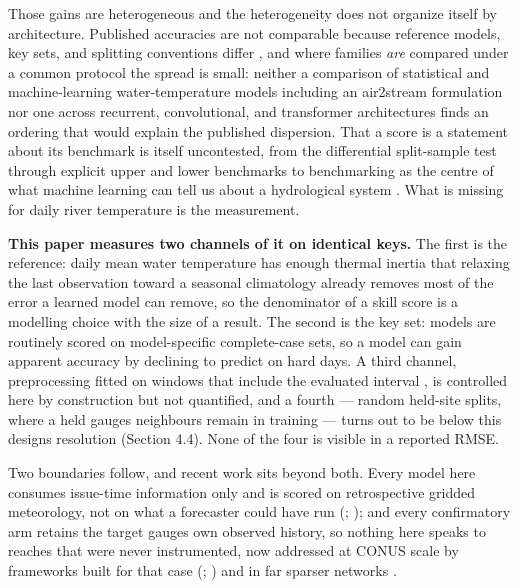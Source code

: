 Those gains are heterogeneous and the heterogeneity does not organize itself by
architecture. Published accuracies are not comparable because reference models,
key sets, and splitting conventions differ
\cite{corona2025ml}, and where
families \emph{are} compared under a common protocol the spread is small: neither a
comparison of statistical and machine-learning water-temperature models
including an air2stream formulation
\cite{feigl2021ml} nor one across
recurrent, convolutional, and transformer architectures
\cite{liu2025rnns} finds an ordering
that would explain the published dispersion. That a score is a statement about
its benchmark is itself uncontested, from the differential split-sample test
\cite{klemes1986operational} through explicit
upper and lower benchmarks
\cite{seibert2018upper} to benchmarking as
the centre of what machine learning can tell us about a hydrological system
\cite{nearing2021what}. What is missing
for daily river temperature is the measurement.

\textbf{This paper measures two channels of it on identical keys.} The first is the
reference: daily mean water temperature has enough thermal inertia that relaxing
the last observation toward a seasonal climatology already removes most of the
error a learned model can remove, so the denominator of a skill score is a
modelling choice with the size of a result. The second is the key set: models
are routinely scored on model-specific complete-case sets, so a model can gain
apparent accuracy by declining to predict on hard days. A third channel,
preprocessing fitted on windows that include the evaluated interval
\cite{arsenault2018comparison}, is
controlled here by construction but not quantified, and a fourth --- random
held-site splits, where a held gauge\textquotesingle s neighbours remain in training
\cite{kratzert2019towards} --- turns out to
be below this design\textquotesingle s resolution (Section 4.4). None of the four is visible in
a reported RMSE.

Two boundaries follow, and recent work sits beyond both. Every model here
consumes issue-time information only and is scored on retrospective gridded
meteorology, not on what a forecaster could have run
(;
); and every
confirmatory arm retains the target gauge\textquotesingle s own observed history, so nothing here
speaks to reaches that were never instrumented, now addressed at CONUS scale by
frameworks built for that case
(;
) and in
far sparser networks
\cite{chang2025arctic}.

